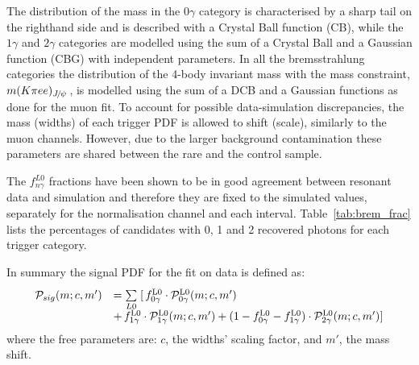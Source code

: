 The distribution of the \mKpiee mass in the $0\gamma$ category is characterised by a sharp tail on the righthand side and is described 
with a Crystal Ball function (CB), while the $1\gamma$ and $2\gamma$ categories are modelled using the sum of a Crystal Ball 
and a Gaussian function (CBG) with independent parameters. In all the bremsstrahlung categories the distribution of the 4-body 
invariant mass with the \jpsi mass constraint, $m(K\pi ee)_{\jpsi}$, is modelled using the sum of a DCB and a Gaussian 
functions as done for the muon fit.
%
To account for possible data-simulation discrepancies, the mass (widths) of each trigger PDF is allowed to shift (scale), similarly to the muon channels.
However, due to the larger background contamination these parameters are shared between the rare and the \BdToKstJPsee control sample.


The $f^{L0}_{n\gamma}$ fractions have been shown to be in good agreement between 
resonant data and simulation and therefore they are fixed to the simulated values, separately
for the normalisation channel and each \qsq interval. Table~\ref{tab:brem_frac} lists the percentages
of candidates with 0, 1 and 2 recovered photons for each trigger category.

In summary the signal PDF for the fit on data is defined as:
%
\begin{equation}
\begin{array} {ll}
\mathcal{P}_{sig}(m;c,m') & = \sum\limits_{L0}^{} \;[ \, f^{\rm L0}_{0\gamma} \cdot \mathcal{P}^{\rm L0}_{0\gamma}(m;c,m')  \\
& + \, f^{\rm L0}_{1\gamma} \cdot \mathcal{P}^{\rm L0}_{1\gamma}(m;c,m') + (1 - f^{\rm L0}_{0\gamma} - f^{\rm L0}_{1\gamma}) \cdot \mathcal{P}^{\rm L0}_{2\gamma}(m;c,m')]
\end{array} 
\end{equation}
%
where the free parameters are: $c$, the widths' scaling factor, and $m'$, the mass shift.



